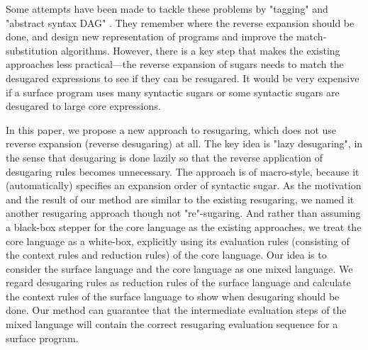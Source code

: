 Some attempts have been made to tackle these problems by "tagging" \cite{resugaring} and "abstract syntax DAG" \cite{hygienic}.
They remember where the reverse expansion should be done, and design new representation of programs and improve the match-substitution algorithms.
However, there is a key step that makes the existing approaches less practical---the reverse expansion of sugars needs to match the desugared expressions to see if they can be resugared. It would be very expensive if a surface program uses many syntactic sugars or some syntactic sugars are desugared to large core expressions.



\label{mark:mention}
In this paper, we propose a new approach to resugaring, which does not use reverse expansion (reverse desugaring) at all.
The key idea is "lazy desugaring", in the sense that desugaring is done lazily  so that the reverse application of desugaring rules becomes unnecessary. The approach is of macro-style, because it (automatically) specifies an expansion order of syntactic sugar. As the motivation and the result of our method are similar to the existing resugaring, we named it another resugaring approach though not "re"-sugaring. And rather than assuming a black-box stepper for the core language as the existing approaches, we treat the core language as a white-box, explicitly using
its evaluation rules (consisting of the context rules and reduction rules) of the core language.
Our idea is to consider the surface language and the core language as one mixed language. We regard desugaring rules as reduction rules of the surface language and calculate the context rules of the surface language to show when desugaring
should be done. Our method can guarantee that the intermediate evaluation steps of the mixed language will contain the correct resugaring evaluation sequence for a surface program.

